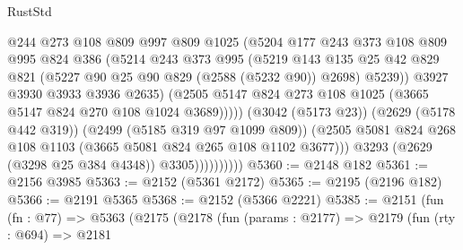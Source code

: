 \begin{lexlean}{RustStd}
\begin{coremodule}
                                @244
                                @273
                                @108
                                @809
                                @997
                                @809
                                @1025
                                (@5204
                                  @177
                                  @243
                                  @373
                                  @108
                                  @809
                                  @995
                                  @824
                                  @386
                                  (@5214
                                    @243
                                    @373
                                    @995
                                    (@5219
                                      @143
                                      @135
                                      @25
                                      @42
                                      @829
                                      @821
                                      (@5227 @90 @25 @90 @829 (@2588 (@5232 @90)) @2698)
                                      @5239))
                                  @3927
                                  @3930
                                  @3933
                                  @3936
                                  @2635)
                                (@2505
                                  @5147
                                  @824
                                  @273
                                  @108
                                  @1025
                                  (@3665 @5147 @824 @270 @108 @1024 @3689)))))
                          (@3042 (@5173 @23))
                          (@2629 (@5178 @442 @319))
                          (@2499 (@5185 @319 @97 @1099 @809))
                          (@2505
                            @5081
                            @824
                            @268
                            @108
                            @1103
                            (@3665 @5081 @824 @265 @108 @1102 @3677)))
                        @3293
                        (@2629 (@3298 @25 @384 @4348))
                        @3305))))))))))
@5360 := @2148 @182
@5361 := @2156 @3985
@5363 := @2152 (@5361 @2172)
@5365 := @2195 (@2196 @182)
@5366 := @2191 @5365
@5368 := @2152 (@5366 @2221)
@5385 := @2151
    (fun (fn : @77) =>
    @5363
      (@2175
        (@2178
          (fun (params : @2177) =>
          @2179
            (fun (rty : @694) =>
            @2181

\end{coremodule}
\end{lexlean}
